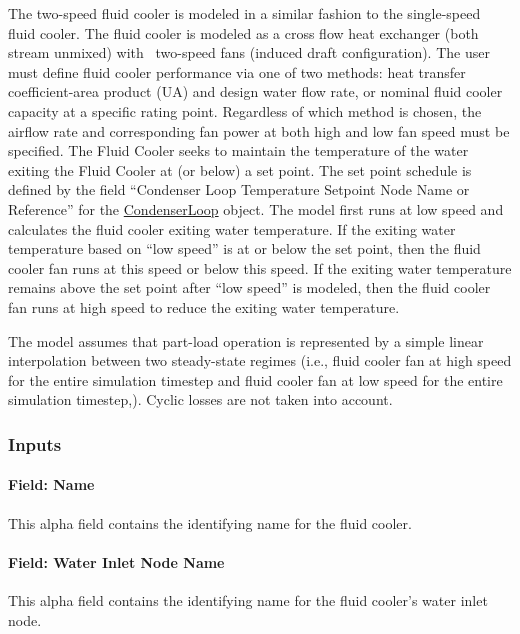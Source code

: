 The two-speed fluid cooler is modeled in a similar fashion to the single-speed fluid cooler. The fluid cooler is modeled as a cross flow heat exchanger (both stream unmixed) with~ two-speed fans (induced draft configuration). The user must define fluid cooler performance via one of two methods: heat transfer coefficient-area product (UA) and design water flow rate, or nominal fluid cooler capacity at a specific rating point. Regardless of which method is chosen, the airflow rate and corresponding fan power at both high and low fan speed must be specified. The Fluid Cooler seeks to maintain the temperature of the water exiting the Fluid Cooler at (or below) a set point. The set point schedule is defined by the field ``Condenser Loop Temperature Setpoint Node Name or Reference'' for the \hyperref[condenserloop]{CondenserLoop} object. The model first runs at low speed and calculates the fluid cooler exiting water temperature. If the exiting water temperature based on ``low speed'' is at or below the set point, then the fluid cooler fan runs at this speed or below this speed. If the exiting water temperature remains above the set point after ``low speed'' is modeled, then the fluid cooler fan runs at high speed to reduce the exiting water temperature.

The model assumes that part-load operation is represented by a simple linear interpolation between two steady-state regimes (i.e., fluid cooler fan at high speed for the entire simulation timestep and fluid cooler fan at low speed for the entire simulation timestep,). Cyclic losses are not taken into account.

\subsubsection{Inputs}\label{inputs-9-003}

\paragraph{Field: Name}\label{field-name-8-003}

This alpha field contains the identifying name for the fluid cooler.

\paragraph{Field: Water Inlet Node Name}\label{field-water-inlet-node-name-6}

This alpha field contains the identifying name for the fluid cooler's water inlet node.

